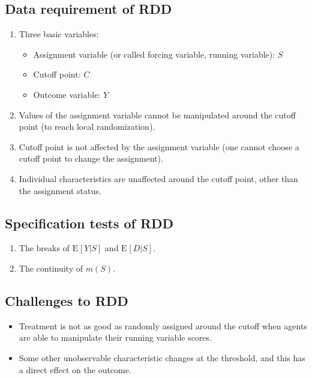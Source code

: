 \documentclass[
]{ctexart}
\providecommand{\tightlist}{%
  \setlength{\itemsep}{0pt}\setlength{\parskip}{0pt}}
\newcommand{\0}{\textbf 0}
\newcommand{\1}{\textbf 1}
\providecommand{\e}{}\renewcommand{\e}[2][]{\text{E}_{#1}\br{#2}}
\def\br#1{\left[#1\right]}
\def\pr#1{\left(#1\right)}
\begin{document}
\hypertarget{data-requirement-of-rdd}{%
\subsection{Data requirement of RDD}\label{data-requirement-of-rdd}}

\begin{enumerate}
\def\labelenumi{\arabic{enumi}.}
\tightlist
\item
  Three basic variables:

  \begin{itemize}
  \tightlist
  \item
    Assignment variable (or called forcing variable, running variable):
    \(S\)
  \item
    Cutoff point: \(C\)
  \item
    Outcome variable: \(Y\)
  \end{itemize}
\item
  Values of the assignment variable cannot be manipulated around the
  cutoff point (to reach local randomization).
\item
  Cutoff point is not affected by the assignment variable (one cannot
  choose a cutoff point to change the assignment).
\item
  Individual characteristics are unaffected around the cutoff point,
  other than the assignment status.
\end{enumerate}

\hypertarget{specification-tests-of-rdd}{%
\subsection{Specification tests of
RDD}\label{specification-tests-of-rdd}}

\begin{enumerate}
\def\labelenumi{\arabic{enumi}.}
\tightlist
\item
  The breaks of \(\e{Y|S}\) and \(\e{D|S}\).
\item
  The continuity of \(m\pr S\).
\end{enumerate}

\hypertarget{challenges-to-rdd}{%
\subsection{Challenges to RDD}\label{challenges-to-rdd}}

\begin{itemize}
\tightlist
\item
  Treatment is not as good as randomly assigned around the cutoff when
  agents are able to manipulate their running variable scores.
\item
  Some other unobservable characteristic changes at the threshold, and
  this has a direct effect on the outcome.
\end{itemize}
\end{document}
